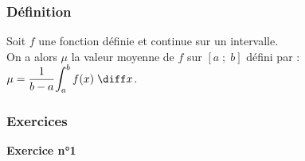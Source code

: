 \subsubsection{Définition}

Soit $f$ une fonction définie et continue sur un intervalle. \\

On a alors $\mu$ la valeur moyenne de $f$ sur $\left[a \; ; \; b\right]$ défini par : $\mu = \dfrac{1}{b-a} \displaystyle{\int_a^b f(x) \; \diff x}$. 

\subsubsection{Exercices}

\textbf{Exercice n°1} \\

